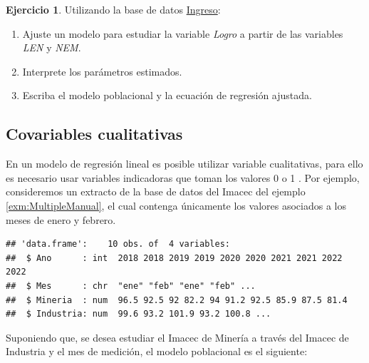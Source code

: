 \documentclass[
  11pt,
]{book}
\newenvironment{Shaded}{\begin{snugshade}}{\end{snugshade}}
\newcommand{\FunctionTok}[1]{\textcolor[rgb]{0.13,0.29,0.53}{\textbf{#1}}}
\newcommand{\NormalTok}[1]{#1}
\newcommand{\OtherTok}[1]{\textcolor[rgb]{0.56,0.35,0.01}{#1}}
\newcommand{\SpecialCharTok}[1]{\textcolor[rgb]{0.81,0.36,0.00}{\textbf{#1}}}
\newcommand{\StringTok}[1]{\textcolor[rgb]{0.31,0.60,0.02}{#1}}
\providecommand{\tightlist}{%
  \setlength{\itemsep}{0pt}\setlength{\parskip}{0pt}}
\theoremstyle{definition}
\theoremstyle{definition}
\theoremstyle{definition}
\newtheorem{exercise}{Ejercicio}[chapter]
\theoremstyle{definition}
\theoremstyle{remark}
\begin{document}
\begin{exercise}

Utilizando la base de datos \hyperref[Ingreso]{Ingreso}:

\begin{enumerate}
\def\labelenumi{\arabic{enumi}.}
\tightlist
\item
  Ajuste un modelo para estudiar la variable \emph{Logro} a partir de las variables \emph{LEN} y \emph{NEM}.
\item
  Interprete los parámetros estimados.
\item
  Escriba el modelo poblacional y la ecuación de regresión ajustada.
\end{enumerate}

\end{exercise}

\subsection{Covariables cualitativas}\label{covariables-cualitativas}

En un modelo de regresión lineal es posible utilizar variable cualitativas, para ello es necesario usar variables indicadoras que toman los valores 0 o 1 \citep{neter}. Por ejemplo, consideremos un extracto de la base de datos del Imacec del ejemplo \ref{exm:MultipleManual}, el cual contenga únicamente los valores asociados a los meses de enero y febrero.

\begin{Shaded}
\end{Shaded}

\begin{verbatim}
## 'data.frame':    10 obs. of  4 variables:
##  $ Ano      : int  2018 2018 2019 2019 2020 2020 2021 2021 2022 2022
##  $ Mes      : chr  "ene" "feb" "ene" "feb" ...
##  $ Mineria  : num  96.5 92.5 92 82.2 94 91.2 92.5 85.9 87.5 81.4
##  $ Industria: num  99.6 93.2 101.9 93.2 100.8 ...
\end{verbatim}

Suponiendo que, se desea estudiar el Imacec de Minería a través del Imacec de Industria y el mes de medición, el modelo poblacional es el siguiente:
\end{document}
